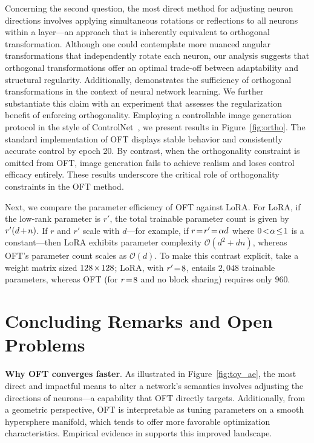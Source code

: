 \begin{itemize}[leftmargin=*,nosep]
Concerning the second question, the most direct method for adjusting neuron directions involves applying simultaneous rotations or reflections to all neurons within a layer—an approach that is inherently equivalent to orthogonal transformation. Although one could contemplate more nuanced angular transformations that independently rotate each neuron, our analysis suggests that orthogonal transformations offer an optimal trade-off between adaptability and structural regularity. Additionally, \cite{liu2021orthogonal} demonstrates the sufficiency of orthogonal transformations in the context of neural network learning. We further substantiate this claim with an experiment that assesses the regularization benefit of enforcing orthogonality. Employing a controllable image generation protocol in the style of ControlNet~\cite{zhang2023adding}, we present results in Figure~\ref{fig:ortho}. The standard implementation of OFT displays stable behavior and consistently accurate control by epoch 20. By contrast, when the orthogonality constraint is omitted from OFT, image generation fails to achieve realism and loses control efficacy entirely. These results underscore the critical role of orthogonality constraints in the OFT method.

Next, we compare the parameter efficiency of OFT against LoRA. For LoRA, if the low-rank parameter is $r'$, the total trainable parameter count is given by $\thickmuskip=2mu \medmuskip=2mu r'(d+n)$. If $r$ and $r'$ scale with $d$—for example, if $\thickmuskip=2mu \medmuskip=2mu r=r'=\alpha d$ where $\thickmuskip=2mu \medmuskip=2mu 0<\alpha\leq 1$ is a constant—then LoRA exhibits parameter complexity $\mathcal{O}(d^2+dn)$, whereas OFT's parameter count scales as $\mathcal{O}(d)$. To make this contrast explicit, take a weight matrix sized $\thickmuskip=2mu \medmuskip=2mu 128\times 128$; LoRA, with $\thickmuskip=2mu \medmuskip=2mu r'=8$, entails $2,048$ trainable parameters, whereas OFT (for $\thickmuskip=2mu \medmuskip=2mu r=8$ and no block sharing) requires only $960$.

\section{Concluding Remarks and Open Problems}

\textbf{Why OFT converges faster}. As illustrated in Figure~\ref{fig:toy_ae}, the most direct and impactful means to alter a network's semantics involves adjusting the directions of neurons—a capability that OFT directly targets. Additionally, from a geometric perspective, OFT is interpretable as tuning parameters on a smooth hypersphere manifold, which tends to offer more favorable optimization characteristics. Empirical evidence in \cite{liu2021orthogonal} supports this improved landscape.


\end{itemize}
